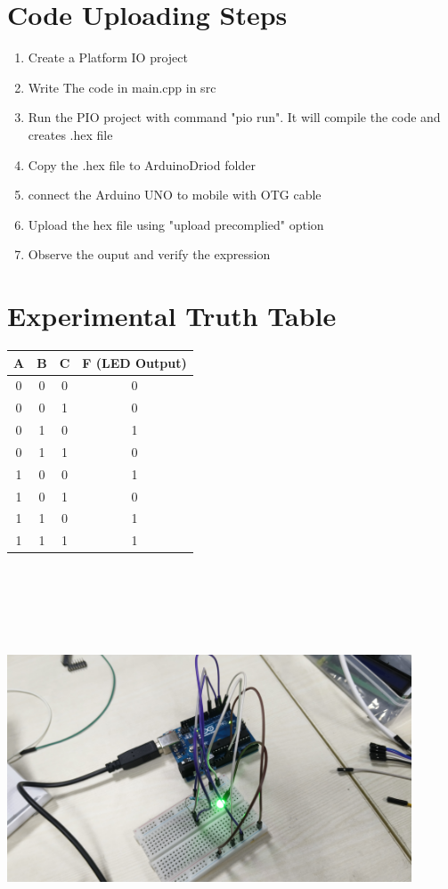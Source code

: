 \documentclass[a4paper,12pt]{article}
\begin{document}
\section*{Code Uploading Steps}
\begin{enumerate}
	\item Create a Platform IO project
	\item Write The code in main.cpp in src
	\item Run the PIO project with command "pio run". It will compile the code and creates .hex file
	\item Copy the .hex file to ArduinoDriod folder
	\item connect the Arduino UNO to mobile with OTG cable
	\item Upload the hex file using "upload precomplied" option
	\item Observe the ouput and verify the expression
\end{enumerate}
\section*{Experimental Truth Table}
\begin{table}[H]
\centering
\begin{tabular}{|c|c|c|c|}
\hline
A & B & C & F (LED Output) \\ \hline
0 & 0 & 0 & 0 \\
0 & 0 & 1 & 0 \\
0 & 1 & 0 & 1 \\
0 & 1 & 1 & 0 \\
1 & 0 & 0 & 1 \\
1 & 0 & 1 & 0 \\
1 & 1 & 0 & 1 \\
1 & 1 & 1 & 1 \\
\hline
\end{tabular}
\end{table}
\begin{center}
	\includegraphics[width=12cm, height=12cm]{Output.jpg}
\end{center}
\end{document}
